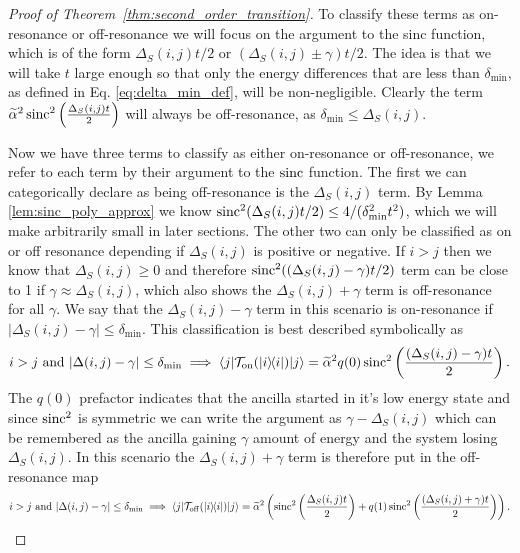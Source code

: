 \begin{proof}[Proof of Theorem~\ref{thm:second_order_transition}]
    To classify these terms as on-resonance or off-resonance we will focus on the argument to the sinc function, which is of the form $\Delta_S(i,j) t/ 2$ or $(\Delta_S(i,j) \pm \gamma) t/ 2$. The idea is that we will take $t$ large enough so that only the energy differences that are less than $\delta_{\min}$, as defined in Eq. \eqref{eq:delta_min_def}, will be non-negligible. Clearly the term $\widetilde{\alpha}^2 \operatorname{sinc}^2 \left( \frac{\Delta_S(i,j)t}{2} \right)$ will always be off-resonance, as $\delta_{\min} \le \Delta_S(i,j)$. 
    
    Now we have three terms to classify as either on-resonance or off-resonance, we refer to each term by their argument to the $\operatorname{sinc}$ function. The first we can categorically declare as being off-resonance is the $\Delta_S(i,j)$ term. By Lemma \ref{lem:sinc_poly_approx} we know $\operatorname{sinc}^2(\Delta_S(i,j) t/ 2) \le 4 / (\delta_{\min}^2 t^2)$, which we will make arbitrarily small in later sections. The other two can only be classified as on or off resonance depending if $\Delta_S(i,j)$ is positive or negative. If $i > j$ then we know that $\Delta_S(i,j) \ge 0$ and therefore $\operatorname{sinc}^2((\Delta_S(i,j) - \gamma)t/2)$ term can be close to 1 if $\gamma \approx \Delta_{S}(i,j)$, which also shows the $\Delta_S(i,j) + \gamma$ term is off-resonance for all $\gamma$. We say that the $\Delta_S(i,j) - \gamma$ term in this scenario is on-resonance if $|\Delta_S(i,j) - \gamma| \le \delta_{\min}$. This classification is best described symbolically as
    \begin{equation}
    i > j \text{ and } |\Delta(i,j) - \gamma| \le \delta_{\min} \implies  \langle j| \mathcal{T}_{\rm on}(| i\rangle\! \langle i|) |j\rangle = \widetilde{\alpha}^2 q(0) \operatorname{sinc}^2 \left( \frac{(\Delta_S(i,j) - \gamma)t}{2} \right).\label{eq:on_resonance_i_geq_j}
    \end{equation}
    The $q(0)$ prefactor indicates that the ancilla started in it's low energy state and since $\operatorname{sinc}^2$ is symmetric we can write the argument as $\gamma - \Delta_S(i,j)$ which can be remembered as the ancilla gaining $\gamma$ amount of energy and the system losing $\Delta_S(i,j)$. In this scenario the $\Delta_S(i,j) + \gamma$ term is therefore put in the off-resonance map
    \begin{align}
        i > j \text{ and } |\Delta(i,j) - \gamma| \le \delta_{\min} \implies  \langle j| \mathcal{T}_{\rm off}(| i\rangle\! \langle i|) |j\rangle = \widetilde{\alpha}^2\left( \operatorname{sinc}^2 \left( \frac{\Delta_S(i,j) t}{2} \right) + q(1) \operatorname{sinc}^2 \left(\frac{(\Delta_S(i,j) + \gamma) t}{2} \right) \right).
    \end{align}
    

\end{proof}
